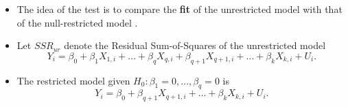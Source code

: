 \documentclass[notes=show,compress,beamer]{beamer}
\begin{document}
\begin{frame}[shrink]%


\begin{itemize}
\item The idea of the test is to compare the \textbf{fit} of the 
\color{blue}%
unrestricted model 
\color{black}
with that of the 
\color{red}%
null-restricted model%
\color{black}%
.%
\pause%

\item Let%
\color{blue}
$SSR_{ur}$ 
\color{black}%
denote the Residual Sum-of-Squares of the 
\color{blue}%
unrestricted model 
\color{black}%
\begin{equation*}
Y_{i}=\beta _{0}+\beta _{1}X_{1,i}+\ldots +\beta _{q}X_{q,i}+\beta
_{q+1}X_{q+1,i}+\ldots +\beta _{k}X_{k,i}+U_{i}.
\end{equation*}%
\pause%

\item The 
\color{red}%
restricted model 
\color{black}%
given $H_{0}:\beta _{1}=0,\ldots ,\beta _{q}=0$ is%
\begin{equation*}
Y_{i}=\beta _{0}+\beta _{q+1}X_{q+1,i}+\ldots +\beta _{k}X_{k,i}+U_{i}.
\end{equation*}%
\pause%


\end{itemize}
\end{frame}
\end{document}
